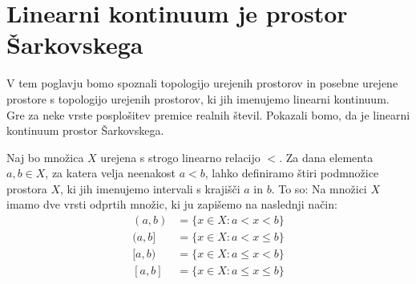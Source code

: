 \documentclass[mat2]{fmfdelo}
\begin{document}


\section{Linearni kontinuum je prostor Šarkovskega}
V tem poglavju bomo spoznali topologijo urejenih prostorov in posebne urejene prostore s topologijo urejenih prostorov, ki jih imenujemo linearni kontinuum. Gre za neke vrste posplošitev premice realnih števil. Pokazali bomo, da je linearni kontinuum prostor Šarkovskega.

Naj bo množica $X$ urejena s strogo linearno relacijo $<$. Za dana elementa $a, b \in X$, za katera velja neenakost $a<b$, lahko definiramo štiri podmnožice prostora $X$, ki jih imenujemo intervali s krajišči $a$ in $b$. To so:
 Na množici $X$ imamo dve vrsti odprtih množic, ki ju zapišemo na naslednji način:
\begin{equation*} %
\begin{split}
(a, b) &= \{x \in X: a< x <b\} \\ 
(a, b] &= \{x \in X: a< x \leq b\} \\ 
[a, b) &= \{x \in X: a \leq x< b\} \\ 
[a, b] &= \{x \in X: a \leq x \leq b\}
\end{split}
\end{equation*}
\end{document}
